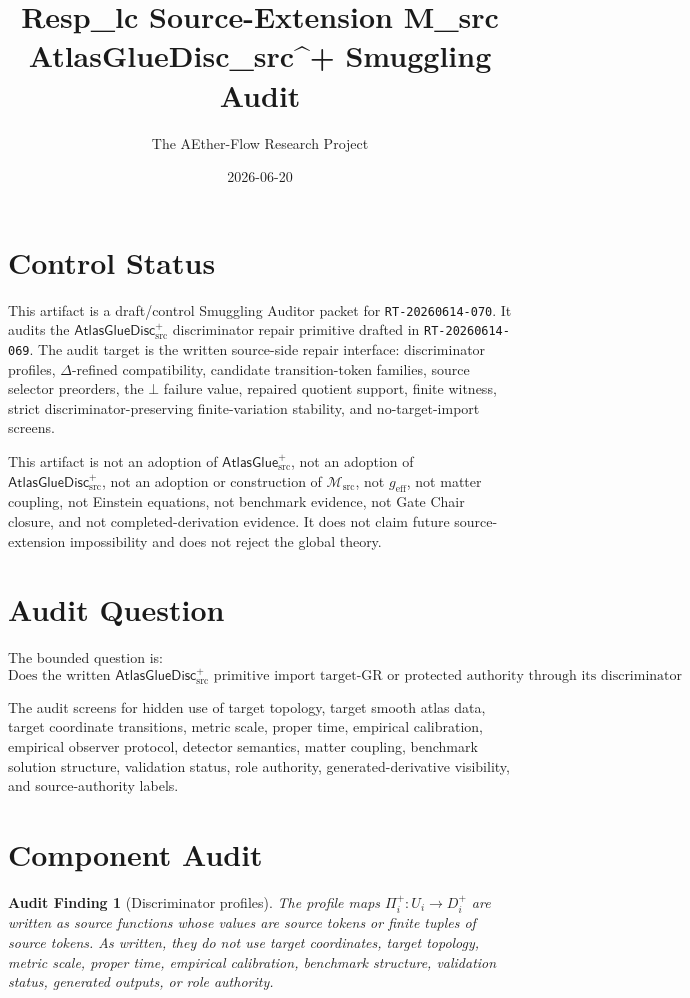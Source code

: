 \documentclass[11pt]{article}
\title{Resp\_lc Source-Extension M\_src AtlasGlueDisc\_src\^{}+ Smuggling Audit}
\author{The AEther-Flow Research Project}
\date{2026-06-20}
\newcommand{\Msrc}{\mathcal{M}_{\mathrm{src}}}
\newcommand{\geff}{g_{\mathrm{eff}}}
\newcommand{\AtlasGlue}{\mathsf{AtlasGlue}_{\mathrm{src}}^{+}}
\newcommand{\AtlasGlueDisc}{\mathsf{AtlasGlueDisc}_{\mathrm{src}}^{+}}
\newcommand{\Prof}{\Pi^{+}}
\newtheorem{audit}{Audit Finding}
\begin{document}
\maketitle

\section*{Control Status}

This artifact is a draft/control Smuggling Auditor packet for
\texttt{RT-20260614-070}. It audits the \(\AtlasGlueDisc\) discriminator
repair primitive drafted in \texttt{RT-20260614-069}. The audit target is the
written source-side repair interface: discriminator profiles,
\(\Delta\)-refined compatibility, candidate transition-token families,
source selector preorders, the \(\bot\) failure value, repaired quotient
support, finite witness, strict discriminator-preserving finite-variation
stability, and no-target-import screens.

This artifact is not an adoption of \(\AtlasGlue\), not an adoption of
\(\AtlasGlueDisc\), not an adoption or construction of \(\Msrc\), not
\(\geff\), not matter coupling, not Einstein equations, not benchmark
evidence, not Gate Chair closure, and not completed-derivation evidence. It
does not claim future source-extension impossibility and does not reject the
global theory.

\section{Audit Question}

The bounded question is:
\[
\text{Does the written }\AtlasGlueDisc\text{ primitive import target-GR or
protected authority through its discriminator repair language?}
\]

The audit screens for hidden use of target topology, target smooth atlas data,
target coordinate transitions, metric scale, proper time, empirical
calibration, empirical observer protocol, detector semantics, matter
coupling, benchmark solution structure, validation status, role authority,
generated-derivative visibility, and source-authority labels.

\section{Component Audit}

\begin{audit}[Discriminator profiles]
The profile maps \(\Prof_i:U_i\to D_i^+\) are written as source functions
whose values are source tokens or finite tuples of source tokens. As written,
they do not use target coordinates, target topology, metric scale, proper
time, empirical calibration, benchmark structure, validation status, generated
outputs, or role authority.
\end{audit}
\end{document}

